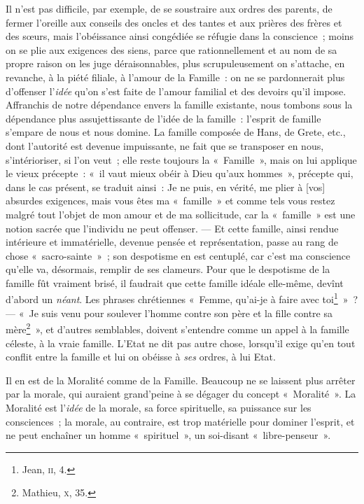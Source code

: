 \documentclass[french,twoside]{book} %
\newcommand\corr[1]{#1}
\begin{document}
Il n’est pas difficile, par exemple, de se soustraire aux ordres des parents, de fermer l’oreille aux conseils des oncles et des tantes et aux prières des frères et des sœurs, mais l’obéissance ainsi congédiée se réfugie dans la conscience ; moins on se plie aux exigences des siens, parce que rationnellement et au nom de sa propre raison on les juge déraisonnables, plus scrupuleusement on s’attache, en revanche, à la piété filiale, à l’amour de la Famille : on ne se pardonnerait plus d’offenser l’\emph{idée} qu’on s’est faite de l’amour familial et des devoirs qu’il impose. Affranchis de notre dépendance envers la famille existante, nous tombons sous la dépendance plus assujettissante de l’idée de la famille : l’esprit de famille s’empare de nous et nous domine. La famille composée de Hans, de Grete, etc., dont l’autorité est devenue impuissante, ne fait que se transposer en nous, s’intérioriser, si l’on veut ; elle reste toujours la « Famille », mais on lui applique le vieux précepte : « il vaut mieux obéir à Dieu qu’aux hommes », précepte qui, dans le cas présent, se traduit ainsi : Je ne puis, en vérité, me plier à [{\corr vos}] absurdes exigences, mais vous êtes ma « famille » et comme tels vous restez malgré tout l’objet de mon amour et de ma sollicitude, car la « famille » est une notion sacrée que l’individu ne peut offenser. — Et cette famille, ainsi rendue intérieure et immatérielle, devenue pensée et représentation, passe au rang de chose « sacro-sainte » ; son despotisme en est centuplé, car c’est ma conscience qu’elle va, désormais, remplir de ses clameurs. Pour que le despotisme de la famille fût vraiment brisé, il faudrait que cette famille idéale elle-même, devînt d’abord un \emph{néant}. Les phrases chrétiennes « Femme, qu’ai-je à faire avec toi\footnote{ \noindent Jean, {\scshape ii}, 4.
 } » ? — « Je suis venu  pour soulever l’homme contre son père et la fille contre sa mère\footnote{ \noindent Mathieu, {\scshape x}, 35.
 } », et d’autres semblables, doivent s’entendre comme un appel à la famille céleste, à la vraie famille. L’Etat ne dit pas autre chose, lorsqu’il exige qu’en tout conflit entre la famille et lui on obéisse à \emph{ses} ordres, à lui Etat.\par
Il en est de la Moralité comme de la Famille. Beaucoup ne se laissent plus arrêter par la morale, qui auraient grand’peine à se dégager du concept « Moralité ». La Moralité est l’\emph{idée} de la morale, sa force spirituelle, sa puissance sur les consciences ; la morale, au contraire, est trop matérielle pour dominer l’esprit, et ne peut enchaîner un homme « spirituel », un soi-disant « libre-penseur ».\par
\end{document}
